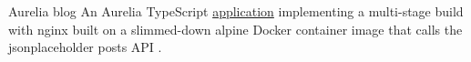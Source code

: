 \datedsubsection{}
{Aurelia blog}
{}
{An Aurelia TypeScript  \href{https://github.com/JacobArchambault/aurelia-blog}{application} implementing a multi-stage build with nginx built on a slimmed-down alpine Docker container image that calls the jsonplaceholder posts API .}
